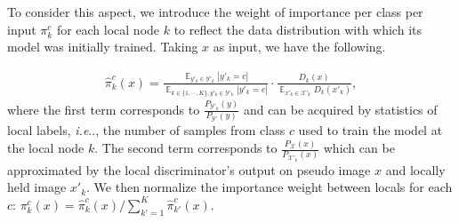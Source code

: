 \documentclass[letterpaper]{article} %
\makeatletter
\DeclareRobustCommand\onedot{\futurelet\@let@token\@onedot}
\def\@onedot{\ifx\@let@token.\else.\null\fi\xspace}
\DeclareMathOperator*{\fe}{\mathbb{E}}
\def\ie{\emph{i.e}\onedot} \def\Ie{\emph{I.e}\onedot}
\newcommand{\domx}{\mathcal{X}}
\newcommand{\domy}{\mathcal{Y}}
\makeatother
\begin{document}
To consider this aspect, we introduce the weight of importance per class per input $\pi_k^c$ for each local node $k$ to reflect the data distribution with which its model was initially trained. Taking $x$ as input, we have the following. 

\begin{equation}
\label{eq:aggweight}
\begin{aligned}
\hat{\pi}_k^c(x) = \frac{\fe_{y'_k \in \domy'_k}|y'_k = c|}{{\fe_{ k \in \{1,\cdots,K\}, y'_k \in \domy'_k} |y'_k = c|}} \cdot \frac{D_k(x)}{\fe_{x'_k \in \domx'_k} D_k(x'_k)},
\end{aligned}
\end{equation}
where the first term corresponds to $\frac{P_{\domy'_k}(y)}{P_{\domy'}(y)}$ and can be acquired by statistics of local labels, \ie, the number of samples from class $c$ used to train the model at the local node $k$. The second term corresponds to $\frac{P_{\domx}(x)}{P_{\domx'_k}(x)}$ which can be approximated by the local discriminator's output on pseudo image $x$ and locally held image $x'_k$. We then normalize the importance weight between locals for each $c$: $\pi_k^c(x) = \hat{\pi}_k^c(x) / \sum_{k'=1}^{K} {\hat{\pi}_{k'}^c (x)}$.
\end{document}
